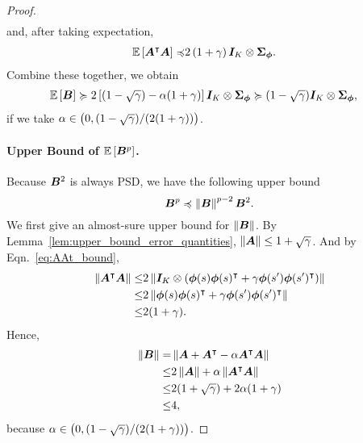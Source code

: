 \begin{proof}
\begin{equation}
\begin{aligned}
\end{aligned}
\end{equation}
and, after taking expectation, 
\begin{equation}\label{eq:EAAt_bound}
\begin{aligned}
    {\mathbb E}\left[{{\bm{A}}^{\intercal}{\bm{A}}}\right]\preccurlyeq&2\left({1+\gamma}\right){\bm{I}}_K\otimes{\bm{\Sigma}}_{{\bm{\phi}}}.
\end{aligned}
\end{equation}
Combine these together, we obtain
\begin{equation*}
\begin{aligned}
    {\mathbb E}\left[{{\bm{B}}}\right]&\succcurlyeq 2\left[{(1-\sqrt\gamma)-\alpha(1+\gamma) }\right]{\bm{I}}_K\otimes{\bm{\Sigma}}_{{\bm{\phi}}}\succcurlyeq (1-\sqrt\gamma){\bm{I}}_K\otimes{\bm{\Sigma}}_{{\bm{\phi}}},
\end{aligned}
\end{equation*}
if we take $\alpha\in\left({0,(1-\sqrt\gamma)/(2(1+\gamma))}\right)$.

\paragraph{Upper Bound of ${\mathbb E}\left[{{\bm{B}}^p}\right]$.}
Because ${\bm{B}}^2$ is always PSD, we have the following upper bound
\begin{equation*}
{\bm{B}}^p\preccurlyeq \left\|{{\bm{B}}}\right\|^{p-2}{\bm{B}}^2.    
\end{equation*}
We first give an almost-sure upper bound for $\left\|{{\bm{B}}}\right\|$.
By Lemma~\ref{lem:upper_bound_error_quantities}, $\left\|{{\bm{A}}}\right\|\leq 1+\sqrt{\gamma}$.
And by Eqn.~\eqref{eq:AAt_bound},
\begin{equation}\label{eq:norm_AAt_bound}
\begin{aligned}
    \left\|{{\bm{A}}^{\intercal}{\bm{A}}}\right\|\leq&2\left\|{{\bm{I}}_K\otimes\left({{\bm{\phi}}(s){\bm{\phi}}(s)^{\intercal}+\gamma{\bm{\phi}}(s^\prime){\bm{\phi}}(s^\prime)^{\intercal}}\right)}\right\|\\
    \leq&2\left\|{{\bm{\phi}}(s){\bm{\phi}}(s)^{\intercal}+\gamma{\bm{\phi}}(s^\prime){\bm{\phi}}(s^\prime)^{\intercal}}\right\|\\
    \leq& 2(1+\gamma).
\end{aligned}
\end{equation}
Hence,
\begin{equation}\label{eq:norm_B_bound}
\begin{aligned}
    \left\|{{\bm{B}}}\right\|=&\left\|{{\bm{A}}+{\bm{A}}^{\intercal}-\alpha{\bm{A}}^{\intercal}{\bm{A}}}\right\|\\
    \leq &2\left\|{{\bm{A}}}\right\|+\alpha\left\|{{\bm{A}}^{\intercal}{\bm{A}}}\right\|\\
    \leq& 2(1+\sqrt{\gamma})+2\alpha(1+\gamma) \\
    \leq& 4,
\end{aligned}
\end{equation}
because $\alpha\in\left({0,(1-\sqrt\gamma)/(2(1+\gamma))}\right)$.


\end{proof}
